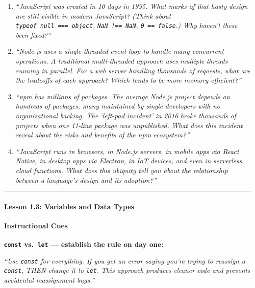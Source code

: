 \documentclass[
  justified,
  openright,
]{tufte-book}
\let\subsubsection\paragraph
\let\paragraph\paragraph
\let\subsubsection\paragraph
\let\paragraph\paragraph
\begin{document}
\begin{enumerate}
\def\labelenumi{\arabic{enumi}.}
\item
  \emph{``JavaScript was created in 10 days in 1995. What marks of that
  hasty design are still visible in modern JavaScript? (Think about
  \texttt{typeof\ null\ ===\ \textquotesingle{}object\textquotesingle{}},
  \texttt{NaN\ !==\ NaN}, \texttt{0\ ==\ false}.) Why haven't these been
  fixed?''}
\item
  \emph{``Node.js uses a single-threaded event loop to handle many
  concurrent operations. A traditional multi-threaded approach uses
  multiple threads running in parallel. For a web server handling
  thousands of requests, what are the tradeoffs of each approach? Which
  tends to be more memory efficient?''}
\item
  \emph{``npm has millions of packages. The average Node.js project
  depends on hundreds of packages, many maintained by single developers
  with no organizational backing. The `left-pad incident' in 2016 broke
  thousands of projects when one 11-line package was unpublished. What
  does this incident reveal about the risks and benefits of the npm
  ecosystem?''}
\item
  \emph{``JavaScript runs in browsers, in Node.js servers, in mobile
  apps via React Native, in desktop apps via Electron, in IoT devices,
  and even in serverless cloud functions. What does this ubiquity tell
  you about the relationship between a language's design and its
  adoption?''}
\end{enumerate}

\begin{center}\rule{0.5\linewidth}{0.5pt}\end{center}

\subsubsection{Lesson 1.3: Variables and Data
Types}\label{lesson-1.3-variables-and-data-types}

\paragraph{Instructional Cues}\label{instructional-cues-1}

\textbf{\texttt{const} vs.~\texttt{let} --- establish the rule on day
one:}

\emph{``Use \texttt{const} for everything. If you get an error saying
you're trying to reassign a \texttt{const}, THEN change it to
\texttt{let}. This approach produces cleaner code and prevents
accidental reassignment bugs.''}
\end{document}
